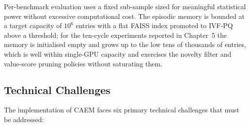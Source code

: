 Per-benchmark evaluation uses a fixed sub-sample sized for meaningful statistical power without excessive computational cost. The episodic memory is bounded at a target capacity of $10^6$ entries with a flat FAISS index promoted to IVF-PQ above a threshold; for the ten-cycle experiments reported in Chapter~5 the memory is initialised empty and grows up to the low tens of thousands of entries, which is well within single-GPU capacity and exercises the novelty filter and value-score pruning policies without saturating them.

\subsection{Technical Challenges}

The implementation of CAEM faces six primary technical challenges that must be addressed:

